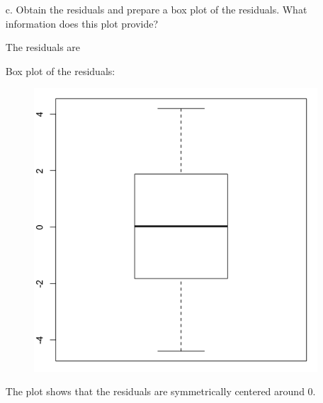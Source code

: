 \documentclass[10pt]{report}
\begin{document}
\begin{enumerate}
	\item [c.]
	Obtain the residuals and prepare a box plot of the residuals. What information does this plot provide?
	
	The residuals are
	
	Box plot of the residuals:
	\begin{figure}[H]
		\centering
		\includegraphics[width=.35\linewidth]{p1/5c.png}
	\end{figure}
	The plot shows that the residuals are symmetrically centered around 0.
	

\end{enumerate}
\end{document}
